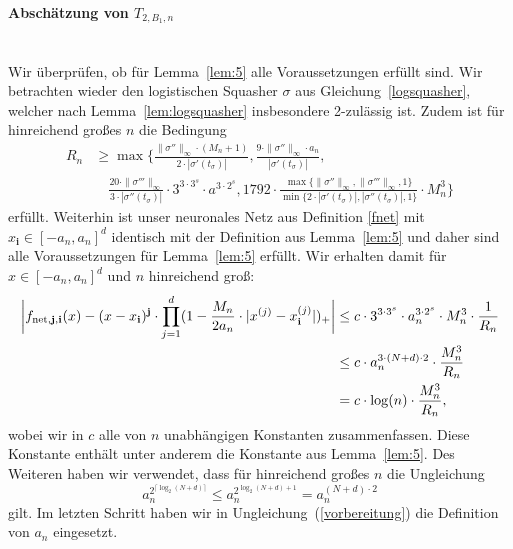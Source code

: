 \paragraph*{Abschätzung von $T_{2,B_1,n}$}\mbox{}\\
Wir überprüfen, ob für Lemma~\ref{lem:5} alle Voraussetzungen erfüllt sind. Wir betrachten wieder den logistischen Squasher $\sigma$ aus Gleichung~\ref{logsquasher}, welcher nach Lemma~\ref{lem:logsquasher} insbesondere 2-zulässig ist. Zudem ist für hinreichend großes $n$ die Bedingung 
\begin{equation*}
\begin{split}
R_n & \geq \max\biggl\{\frac{\|\sigma''\|_{\infty} \cdot (M_n + 1)}{2 \cdot |\sigma'(t_{\sigma})|}, \frac{9 \cdot \|\sigma''\|_{\infty} \cdot a_n}{|\sigma'(t_{\sigma})|}, \\
& \quad \frac{20 \cdot \|\sigma'''\|_{\infty}}{3 \cdot |\sigma''(t_{\sigma})|} \cdot 3^{3 \cdot 3^s} \cdot a^{3 \cdot 2^s}, 1792 \cdot \frac{\max\{\|\sigma''\|_{\infty},\|\sigma'''\|_{\infty}, 1\}}{\min\{2 \cdot |\sigma'(t_{\sigma})|, |\sigma''(t_{\sigma})|, 1\}} \cdot M_n^3 \biggr\}
\end{split}
\end{equation*}
erfüllt. Weiterhin ist unser neuronales Netz aus Definition \ref{fnet} mit $x_{\mathbf{i}} \in [-a_n, a_n]^d$ identisch mit der Definition aus Lemma~\ref{lem:5} und daher sind alle Voraussetzungen für Lemma~\ref{lem:5} erfüllt.
Wir erhalten damit für $x \in [-a_n ,a_n]^d$ und $n$ hinreichend groß:
\begin{equation}
\label{vorbereitung}
\begin{split}
\bigg| f_{\mathrm{net},\mathbf{j},\mathbf{i}}(x) - (x - x_{\mathbf{i}})^{\mathbf{j}} \cdot \prod_{j = 1}^d(1 - \frac{M_n}{2a_n} \cdot |x^{(j)} - x_{\mathbf{i}}^{(j)}|)_+ \bigg| & \leq c \cdot 3^{3 \cdot 3^s} \cdot a_n^{3 \cdot 2^s} \cdot M_n^3 \cdot \frac{1}{R_n} \\
& \leq c\cdot a_n^{3 \cdot (N + d) \cdot 2} \cdot \frac{M_n^3}{R_n} \\
& = c\cdot \log(n) \cdot \frac{M_n^3}{R_n},  
\end{split}
\end{equation}
wobei wir in $c$ alle von $n$ unabhängigen Konstanten zusammenfassen. Diese Konstante enthält unter anderem die Konstante aus Lemma~\ref{lem:5}.
Des Weiteren haben wir verwendet, dass für hinreichend großes $n$ die Ungleichung
$$a_n^{2^{\lceil\log_2(N + d)\rceil}} \leq a_n^{2^{\log_2(N + d) + 1}} = a_n^{(N + d) \cdot 2}$$ gilt. Im letzten Schritt haben wir in Ungleichung~(\ref{vorbereitung}) die Definition von $a_n$ eingesetzt. 
